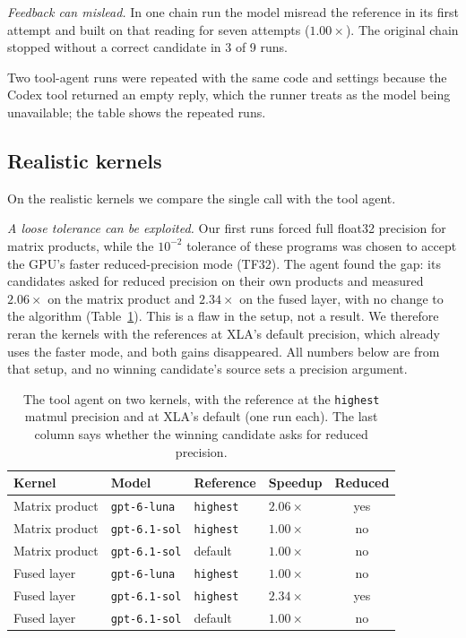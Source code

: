 \documentclass[conference]{IEEEtran}
\begin{document}
\emph{Feedback can mislead.} In one chain run the model misread the reference
in its first attempt and built on that reading for seven attempts
($1.00\times$). The original chain stopped without a correct candidate in 3
of 9 runs.

Two tool-agent runs were repeated with the same code and settings because
the Codex tool returned an empty reply, which the runner treats as the model
being unavailable; the table shows the repeated runs.

\subsection{Realistic kernels}
\label{sec:kernels}
On the realistic kernels we compare the single call with the tool agent.

\emph{A loose tolerance can be exploited.} Our first runs forced full
float32 precision for matrix products, while the $10^{-2}$ tolerance of
these programs was chosen to accept the GPU's faster reduced-precision mode
(TF32). The agent found the gap: its candidates asked for reduced precision
on their own products and measured $2.06\times$ on the matrix product and
$2.34\times$ on the fused layer, with no change to the algorithm
(Table~\ref{tab:precision}). This is a flaw in the setup, not a result. We
therefore reran the kernels with the references at XLA's default precision,
which already uses the faster mode, and both gains disappeared. All numbers
below are from that setup, and no winning candidate's source sets a precision
argument.

\begin{table}[t]
  \centering
  \caption{The tool agent on two kernels, with the reference at the
  \texttt{highest} matmul precision and at XLA's default (one run each).
  The last column says whether the winning candidate asks for reduced
  precision.}
  \label{tab:precision}
  \begin{tabular}{@{}llllc@{}}
    \toprule
    Kernel & Model & Reference & Speedup & Reduced \\
    \midrule
    Matrix product & \texttt{gpt-6-luna} & \texttt{highest} & $2.06\times$ & yes \\
    Matrix product & \texttt{gpt-6.1-sol} & \texttt{highest} & $1.00\times$ & no \\
    Matrix product & \texttt{gpt-6.1-sol} & default & $1.00\times$ & no \\
    Fused layer & \texttt{gpt-6-luna} & \texttt{highest} & $1.00\times$ & no \\
    Fused layer & \texttt{gpt-6.1-sol} & \texttt{highest} & $2.34\times$ & yes \\
    Fused layer & \texttt{gpt-6.1-sol} & default & $1.00\times$ & no \\
    \bottomrule
  \end{tabular}
\end{table}
\end{document}
